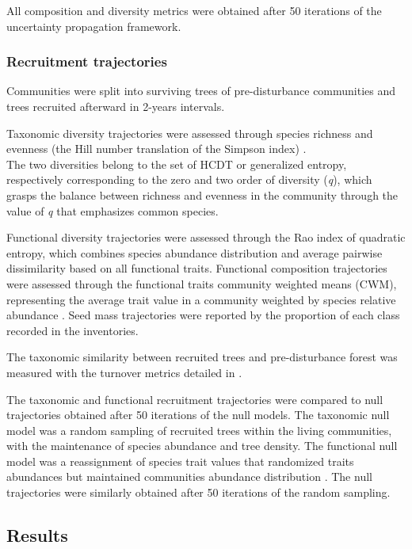 \documentclass[
  11pt,
  french,
  A4paper,
  extrafontsizes,onecolumn,openright
  ]{memoir}
\begin{document}
All composition and diversity metrics were obtained after 50 iterations
of the uncertainty propagation framework.

\subsubsection{Recruitment trajectories}\label{recruitment-trajectories}

Communities were split into surviving trees of pre-disturbance
communities and trees recruited afterward in 2-years intervals.

Taxonomic diversity trajectories were assessed through species richness
and evenness (the Hill number translation of the Simpson index)
\autocites{Chao2015}{Marcon2015b}.\\
The two diversities belong to the set of HCDT or generalized entropy,
respectively corresponding to the zero and two order of diversity
(\emph{q}), which grasps the balance between richness and evenness in
the community through the value of \emph{q} that emphasizes common
species.

Functional diversity trajectories were assessed through the Rao index of
quadratic entropy, which combines species abundance distribution and
average pairwise dissimilarity based on all functional traits.
Functional composition trajectories were assessed through the functional
traits community weighted means (CWM), representing the average trait
value in a community weighted by species relative abundance
\autocite{Diaz2007}. Seed mass trajectories were reported by the
proportion of each class recorded in the inventories.

The taxonomic similarity between recruited trees and pre-disturbance
forest was measured with the turnover metrics detailed in
\textcite{Podani2013a}.

The taxonomic and functional recruitment trajectories were compared to
null trajectories obtained after 50 iterations of the null models. The
taxonomic null model was a random sampling of recruited trees within the
living communities, with the maintenance of species abundance and tree
density. The functional null model was a reassignment of species trait
values that randomized traits abundances but maintained communities
abundance distribution \autocite{Mason2013}. The null trajectories were
similarly obtained after 50 iterations of the random sampling.

\subsection{Results}\label{results-2}
\end{document}
